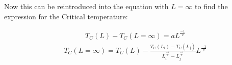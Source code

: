 Now this can be reintroduced into the equation with $L=\infty$ to find the expression for the Critical temperature:

\begin{align*}
&T_C (L) - T_C (L=\infty) = a L^{\frac{-1}{v}}
\end{align*}
\begin{align}
&T_C (L=\infty) = T_C (L) -  \frac{T_C (L_i) - T_C (L_j)} 
{
	L_i^{\frac{-1}{v}}-L_j^{\frac{-1}{v}}
} \label{eq:t-c}
L^{\frac{-1}{v}}
\end{align}
